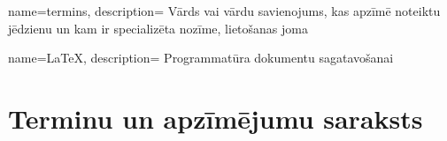 \renewcommand{\glsnamefont}[1]{\textbf{#1}}
\renewcommand{\glossarysection}[2][]{}

{
    name=termins,
    description={
            Vārds vai vārdu savienojums, kas apzīmē noteiktu jēdzienu un kam ir specializēta nozīme, lietošanas joma}
}

{
    name=LaTeX,
    description={
            Programmatūra dokumentu sagatavošanai}
}

\section*{Terminu un apzīmējumu saraksts}
\begin{spacing}{0.5}
    \glsaddall
    \printglossaries
\end{spacing}
